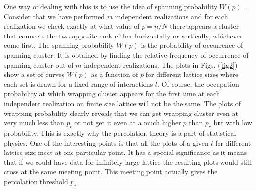\documentclass[twocolumn,showpacs,preprintnumbers,amsmath,amssymb]{article}
\begin{document}
One way of dealing with this is to use the idea of spanning probability $W(p)$ \cite{ref.Ziff_1}.  Consider that we have performed $m$ independent
realizations and for each realization we check exactly at
what value of $p=n/N$ there appears a cluster that connects the two opposite ends either horizontally
or vertically, whichever come first. 
The spanning probability $W(p)$ is the probability of occurrence of spanning cluster. It is obtained by
finding the relative frequency of occurrence of spanning cluster out of $m$ independent realizations. 
The plots in  Figs. (\ref{fig2}) show a set of curves $W(p)$ as a function of $p$ for different lattice sizes
where each set is drawn for a fixed range of interactions $l$. Of course, the occupation probability at which 
wrapping cluster appears for the first time at each independent 
realization on finite size lattice will not be the same. The plots of wrapping probability clearly reveals
that we can get wrapping cluster even at very much less than $p_c$ 
or not get it even at a much higher $p$ than $p_c$ but with low probability.
This is exactly why the percolation theory is a part of statistical physics.   One of the interesting
points is that all the plots of a given $l$ for different lattice size meet at one particular
point. It has a special significance as it means that if we could have data for infinitely large lattice the resulting 
plots would still cross at the same meeting point. This meeting point actually gives
the percolation threshold $p_c$. 
\end{document}
